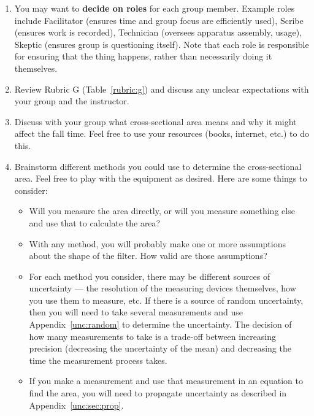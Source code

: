 \begin{enumerate}
	\item You may want to \textbf{decide on roles} for each group member. Example roles include Facilitator (ensures time and group focus are efficiently used), Scribe (ensures work is recorded), Technician (oversees apparatus assembly, usage), Skeptic (ensures group is questioning itself). Note that each role is responsible for ensuring that the thing happens, rather than necessarily doing it themselves. 
	
	\item Review Rubric G (Table~\ref{rubric:g}) and discuss any unclear expectations with your group and the instructor.
	
	\item Discuss with your group what cross-sectional area means and why it might affect the fall time. Feel free to use your resources (books, internet, etc.) to do this.
	
	\item Brainstorm different methods you could use to determine the cross-sectional area. Feel free to play with the equipment as desired. Here are some things to consider:
	\begin{itemize}
		\item Will you measure the area directly, or will you measure something else and use that to calculate the area?
		
		\item With any method, you will probably make one or more assumptions about the shape of the filter. How valid are those assumptions?
		
		\item For each method you consider, there may be different sources of uncertainty --- the resolution of the measuring devices themselves, how you use them to measure, etc. If there is a source of random uncertainty, then you will need to take several measurements and use Appendix~\ref{unc:random} to determine the uncertainty. The decision of how many measurements to take is a trade-off between increasing precision (decreasing the uncertainty of the mean) and decreasing the time the measurement process takes.
		
		\item If you make a measurement and use that measurement in an equation to find the area, you will need to propagate uncertainty as described in Appendix~\ref{unc:sec:prop}.
	\end{itemize}
	

\end{enumerate}
